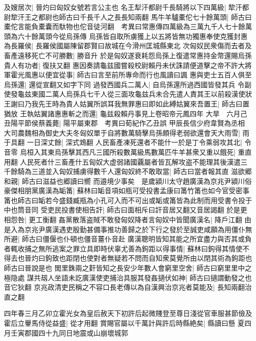 及嫂居次|{
	晉灼曰匈奴女號若言公主也}
名王犁汗都尉千長騎將以下四萬級|{
	犂汗都尉犂汗王之都尉也師古曰千長千人之長長知兩翻}
馬牛羊驢橐佗七十餘萬頭|{
	師古曰橐佗言能負橐囊而馱物也佗音徒河翻　考異曰常惠傳四萬級為三萬九千人七十餘萬頭為六十餘萬頭今從烏孫傳}
烏孫皆自取所虜獲上以五將皆無功獨惠奉使克獲封惠為長羅侯|{
	長羅侯國屬陳留郡賢曰故城在今滑州匡城縣東北}
次匈奴民衆傷而去者及畜產遠移死亡不可勝數|{
	勝音升}
於是匈奴遂衰耗怨烏孫上復遣常惠持金幣還賜烏孫貴人有功者|{
	復扶又翻}
惠因奏請龜兹國嘗殺校尉賴丹未伏誅請便道擊之帝不許大將軍霍光風惠以便宜從事|{
	師古曰言至前所專命而行也風讀曰諷}
惠與吏士五百人俱至烏孫還|{
	還從宣翻又如字下同}
過發西國兵二萬人|{
	自烏孫還所過西國皆發其兵}
令副使發龜兹東國二萬人烏孫兵七千人從三面攻龜兹兵未合先遣人責其王以前殺漢使狀王謝曰乃我先王時為貴人姑翼所誤耳我無罪惠曰即如此縛姑翼來吾置王|{
	師古曰置猶放}
王執姑翼諸惠惠斬之而還|{
	龜兹殺賴丹事見上卷昭帝元鳳四年}
大旱　六月己丑陽平節侯蔡義薨|{
	陽平屬東郡　考異曰荀紀作乙丑誤}
甲辰長信少府韋賢為丞相　大司農魏相為御史大夫冬匈奴單于自將數萬騎擊烏孫頗得老弱欲還會天大雨雪|{
	雨于具翻}
一日深丈餘|{
	深式鴆翻}
人民畜產凍死還者不能什一於是丁令乘弱攻其北|{
	令音零}
烏桓入其東烏孫擊其西凡三國所殺數萬級馬數萬匹牛羊甚衆又重以餓死|{
	重直用翻}
人民死者什三畜產什五匈奴大虚弱諸國覊屬者皆瓦解攻盗不能理其後漢遣三千餘騎為三道並入匈奴捕虜得數千人還匈奴終不敢取當|{
	師古曰當者報其直}
滋欲郷和親|{
	師古曰滋益也郷讀曰嚮}
而邉境少事矣　是歲潁川太守趙廣漢為京兆尹潁川俗豪傑相朋黨廣漢為缿筩|{
	蘇林曰缿音項如瓶可受投書孟康曰筩竹筩也如今官受密事筩也師古曰缿若今盛錢臧瓶為小孔可入而不可出或缿或筩皆為此制而用受書令投于中也筒音同}
受吏民投書使相告訐|{
	師古曰面相斥曰訐音居又翻又音居謁翻}
於是更相怨咎|{
	更工衡翻}
姦黨散落盗賊不敢發匈奴降者言匈奴中皆聞廣漢名|{
	降戶江翻}
由是入為京兆尹廣漢遇吏殷勤甚備事推功善歸之於下行之發於至誠吏咸願為用僵仆無所避|{
	師古曰僵偃也仆頓也僵音薑仆音赴}
廣漢聰明皆知其能之所宜盡力與否其或負者輒收捕之無所逃案之罪立具即時伏辜尤善為鉤距以得事情|{
	蘇林曰鉤得其情使不得去也晉灼曰鉤致也距閉也使對者無疑若不問而自知衆莫覺所由以閉其術為鉤距也師古曰晉說是也}
閭里銖兩之姧皆知之長安少年數人會窮里空舍|{
	師古曰窮里里中之極隐處}
謀共刼人坐語未訖廣漢使吏捕治具服其發姦擿伏如神|{
	師古曰擿謂動發之也音它狄翻}
京兆政清吏民稱之不容口長老傳以為自漢興治京兆者莫能及|{
	長知兩翻治直之翻}


四年春三月乙卯立霍光女為皇后赦天下初許后起微賤登至尊日淺從官車服甚節儉及霍后立轝馬侍從益盛|{
	從才用翻}
賞賜官屬以千萬計與許后時縣絶矣|{
	縣讀曰懸}
夏四月壬寅郡國四十九同日地震或山崩壞城郭

